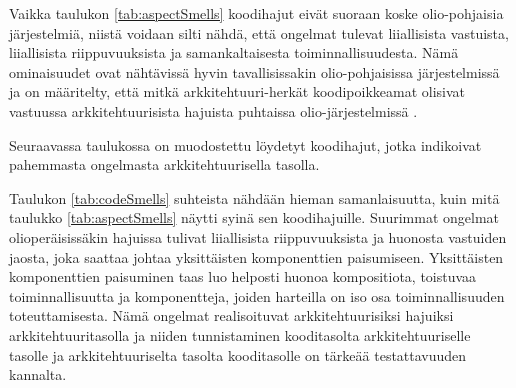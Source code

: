 \documentclass[finnish]{tktltiki2}
\numberwithin{table}{section}
\theoremstyle{definition}
\theoremstyle{remark}
\begin{document}
\noindent
Vaikka taulukon \ref{tab:aspectSmells} koodihajut eivät suoraan koske olio-pohjaisia järjestelmiä, niistä voidaan silti nähdä, että ongelmat tulevat liiallisista vastuista, liiallisista riippuvuuksista ja samankaltaisesta toiminnallisuudesta. Nämä ominaisuudet ovat nähtävissä hyvin tavallisissakin olio-pohjaisissa järjestelmissä ja on määritelty, että mitkä arkkitehtuuri-herkät koodipoikkeamat olisivat vastuussa arkkitehtuurisista hajuista puhtaissa olio-järjestelmissä \citep{macia_enhancing_2013}.

Seuraavassa taulukossa on muodostettu löydetyt koodihajut, jotka indikoivat pahemmasta ongelmasta arkkitehtuurisella tasolla.



\begin{table}[h]
	\centering
	\setlength{\extrarowheight}{1pt}%
	\caption{Olioperäisten koodihajujen ja arkkitehtuuristen hajujen suhde, sekä niiden syyt.}
	\label{tab:codeSmells}
\end{table}


\noindent
Taulukon \ref{tab:codeSmells} suhteista nähdään hieman samanlaisuutta, kuin mitä taulukko \ref{tab:aspectSmells} näytti syinä sen koodihajuille. Suurimmat ongelmat olioperäisissäkin hajuissa tulivat liiallisista riippuvuuksista ja huonosta vastuiden jaosta, joka saattaa johtaa yksittäisten komponenttien paisumiseen. Yksittäisten komponenttien paisuminen taas luo helposti huonoa kompositiota, toistuvaa toiminnallisuutta ja komponentteja, joiden harteilla on iso osa toiminnallisuuden toteuttamisesta. Nämä ongelmat realisoituvat arkkitehtuurisiksi hajuiksi arkkitehtuuritasolla ja niiden tunnistaminen kooditasolta arkkitehtuuriselle tasolle ja arkkitehtuuriselta tasolta kooditasolle on tärkeää testattavuuden kannalta.
\end{document}

